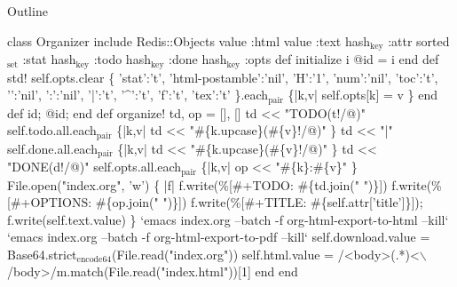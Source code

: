 \documentclass[presentation]{beamer}
\date{\today}
\title{}
\begin{document}
\begin{frame}{Outline}
\tableofcontents
\end{frame}

class Organizer
  include Redis::Objects
  value :html
  value :text
  hash\(_{\text{key}}\) :attr
  sorted\(_{\text{set}}\) :stat
  hash\(_{\text{key}}\) :todo
  hash\(_{\text{key}}\) :done
  hash\(_{\text{key}}\) :opts
  def initialize i
    @id = i
  end
  def std!
    self.opts.clear
    \{
      'stat':'t',
      'html-postamble':'nil',
      'H':'1',
      'num':'nil',
      'toc':'t',
      '\n':'nil',
      ':':'nil',
      '|':'t',
      '\^{}':'t',
      'f':'t',
      'tex':'t'
    \}.each\(_{\text{pair}}\) \{|k,v| self.opts[k] = v \}
  end
  def id; @id; end
  def organize!
    td, op = [], []
    td << "TODO(t!/@)"
    self.todo.all.each\(_{\text{pair}}\) \{|k,v| td << "\#\{k.upcase\}(\#\{v\}!/@)" \}
    td << "|"
    self.done.all.each\(_{\text{pair}}\) \{|k,v| td << "\#\{k.upcase\}(\#\{v\}!/@)" \}
    td << "DONE(d!/@)"
    self.opts.all.each\(_{\text{pair}}\) \{|k,v| op << "\#\{k\}:\#\{v\}" \}
    File.open("index.org", 'w') \{ |f|
      f.write(\%[\#+TODO: \#\{td.join(" ")\}\n])
      f.write(\%[\#+OPTIONS: \#\{op.join(" ")\}\n])
      f.write(\%[\#+TITLE: \#\{self.attr['title']\}\n\n]);
      f.write(self.text.value)
    \}
    `emacs index.org --batch -f org-html-export-to-html --kill`
    `emacs index.org --batch -f org-html-export-to-pdf --kill` 
    self.download.value = Base64.strict\(_{\text{encode64}}\)(File.read("index.org"))
    self.html.value = /<body>(.*)<$\backslash$/body>/m.match(File.read("index.html"))[1]
  end
end
\end{document}
